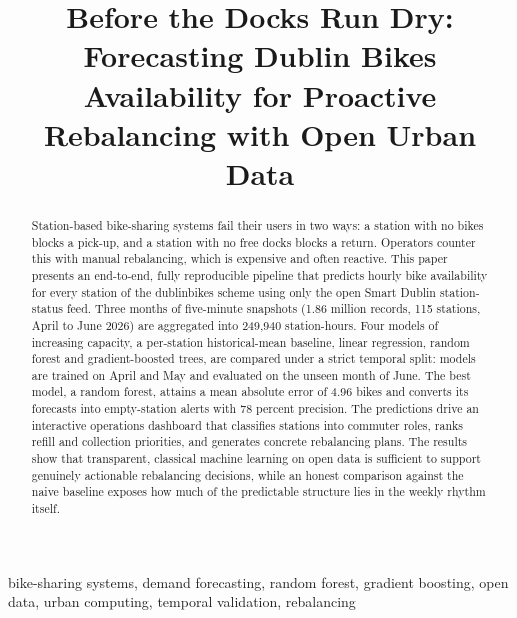 \documentclass[conference]{IEEEtran}
\begin{document}
\title{Before the Docks Run Dry: Forecasting Dublin Bikes Availability for Proactive Rebalancing with Open Urban Data}

\author{
}

\maketitle

\begin{abstract}
Station-based bike-sharing systems fail their users in two ways: a station with no bikes blocks a pick-up, and a station with no free docks blocks a return. Operators counter this with manual rebalancing, which is expensive and often reactive. This paper presents an end-to-end, fully reproducible pipeline that predicts hourly bike availability for every station of the dublinbikes scheme using only the open Smart Dublin station-status feed. Three months of five-minute snapshots (1.86 million records, 115 stations, April to June 2026) are aggregated into 249,940 station-hours. Four models of increasing capacity, a per-station historical-mean baseline, linear regression, random forest and gradient-boosted trees, are compared under a strict temporal split: models are trained on April and May and evaluated on the unseen month of June. The best model, a random forest, attains a mean absolute error of 4.96 bikes and converts its forecasts into empty-station alerts with 78 percent precision. The predictions drive an interactive operations dashboard that classifies stations into commuter roles, ranks refill and collection priorities, and generates concrete rebalancing plans. The results show that transparent, classical machine learning on open data is sufficient to support genuinely actionable rebalancing decisions, while an honest comparison against the naive baseline exposes how much of the predictable structure lies in the weekly rhythm itself.
\end{abstract}

\begin{IEEEkeywords}
bike-sharing systems, demand forecasting, random forest, gradient boosting, open data, urban computing, temporal validation, rebalancing
\end{IEEEkeywords}
\end{document}
